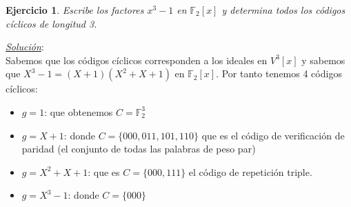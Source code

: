 \documentclass{beamer}
\theoremstyle{plain}
\theoremstyle{example}
\newtheorem{ejercicio} [Ejercicio]{Ejercicio}
\theoremstyle{example}
\begin{document}


\begin{frame}  \small \begin{ejercicio} 

Escribe los factores $x^3-1$ en $\mathbb{F}_2[x]$ y determina todos los códigos cíclicos de longitud 3.

\end{ejercicio} %
\textit{\underline{Solución}}:\\ 

Sabemos que los códigos cíclicos corresponden a los ideales en $V^3[x]$ y sabemos que $X^3-1=(X+1) (X^2+X+1)$ en $\mathbb{F}_2[x]$. Por tanto tenemos 4 códigos cíclicos:

\begin{itemize}
\item $g=1$: que obtenemos $C=\mathbb{F}_2^3$
\item $g=X+1$: donde $C=\{000,011,101,110\}$ que es el código de verificación de paridad (el conjunto de todas las palabras de peso par)
\item $g=X^2+X+1$: que es $C=\{000,111\}$ el código de repetición triple.
\item $g=X^3-1$: donde $C=\{000\}$
\end{itemize}


\end{frame} 
\end{document}
